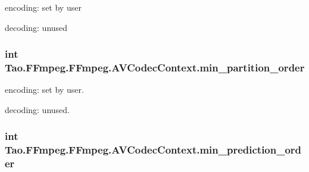 \begin{DoxyItemize}
\item encoding: set by user
\item decoding: unused 
\end{DoxyItemize}\hypertarget{struct_tao_1_1_f_fmpeg_1_1_f_fmpeg_1_1_a_v_codec_context_a7263871881929d1b5ccc21f509bfeee1}{
\subsubsection[{min\_\-partition\_\-order}]{\setlength{\rightskip}{0pt plus 5cm}int {\bf Tao.FFmpeg.FFmpeg.AVCodecContext.min\_\-partition\_\-order}}}
\label{struct_tao_1_1_f_fmpeg_1_1_f_fmpeg_1_1_a_v_codec_context_a7263871881929d1b5ccc21f509bfeee1}

\begin{DoxyItemize}
\item encoding: set by user.
\item decoding: unused. 
\end{DoxyItemize}\hypertarget{struct_tao_1_1_f_fmpeg_1_1_f_fmpeg_1_1_a_v_codec_context_aedf3ce090f99052ddb6199f170b68f2b}{
\subsubsection[{min\_\-prediction\_\-order}]{\setlength{\rightskip}{0pt plus 5cm}int {\bf Tao.FFmpeg.FFmpeg.AVCodecContext.min\_\-prediction\_\-order}}}
\label{struct_tao_1_1_f_fmpeg_1_1_f_fmpeg_1_1_a_v_codec_context_aedf3ce090f99052ddb6199f170b68f2b}

